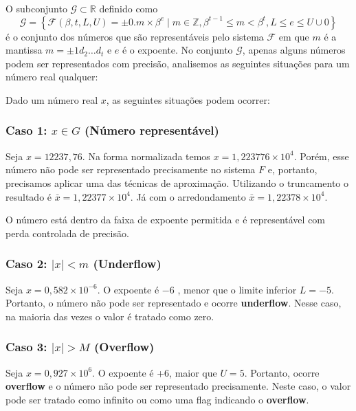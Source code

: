 O subconjunto $\mathcal{G} \subset \mathbb{R}$ definido como
\[
  \mathcal{G} = \left\{ \mathcal{F}(\beta,t,L,U)={\pm 0.m \times \beta^e \mid m \in \mathbb{Z}, \beta^{t-1} \le m < \beta^t, L \leq e \leq U}\cup{0} \right\}
\]
é o conjunto dos números que são representáveis pelo sistema $\mathcal{F}$ em que \( m \) é a mantissa \( m = \pm 1d_2\ldots d_t \) e \( e \) é o expoente. No conjunto $\mathcal{G}$, apenas alguns números podem ser representados com
precisão, analisemos as seguintes situações para um número real qualquer:

Dado um número real $x$, as seguintes situações podem ocorrer:

\subsubsection*{Caso 1: \( x \in G \) (Número representável)}
Seja $x = 12237,76$. Na forma normalizada temos \(x = 1,223776 \times10^4\). Porém, esse número não pode ser representado precisamente no sistema $F$ e, portanto, precisamos aplicar uma das técnicas de aproximação. Utilizando o truncamento o resultado é \( \bar{x} = 1{,}22377 \times 10^4 \). Já com o arredondamento \( \bar{x} = 1{,}22378 \times 10^4 \).

O número está dentro da faixa de expoente permitida e é representável com perda
controlada de precisão.

\subsubsection*{Caso 2: \( |x| < m \) (Underflow)}
Seja \( x = 0{,}582 \times 10^{-6} \). O expoente é \(-6\) , menor que o limite inferior $L = -5$. Portanto, o número não pode ser representado e ocorre \textbf{underflow}. Nesse caso, na maioria das vezes o valor é tratado como zero.

\subsubsection*{Caso 3: \( |x| > M \) (Overflow)}
Seja \( x = 0{,}927 \times 10^6 \). O expoente é +6, maior que $U = 5$. Portanto, ocorre \textbf{overflow} e o número não pode ser representado precisamente. Neste caso, o valor pode ser tratado como infinito ou como uma flag indicando o \textbf{overflow}.

